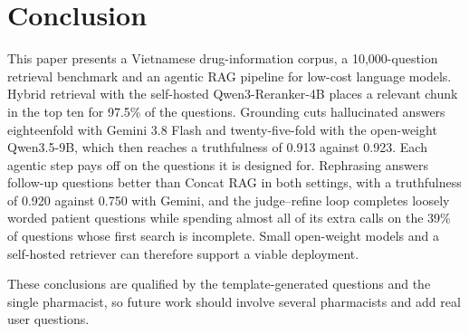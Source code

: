 \section{Conclusion}\label{sec:conclusion}

This paper presents a Vietnamese drug-information corpus, a 10{,}000-question retrieval benchmark and an agentic RAG pipeline for low-cost language models. Hybrid retrieval with the self-hosted Qwen3-Reranker-4B places a relevant chunk in the top ten for 97.5\% of the questions. Grounding cuts hallucinated answers eighteenfold with Gemini 3.8 Flash and twenty-five-fold with the open-weight Qwen3.5-9B, which then reaches a truthfulness of 0.913 against 0.923. Each agentic step pays off on the questions it is designed for. Rephrasing answers follow-up questions better than Concat RAG in both settings, with a truthfulness of 0.920 against 0.750 with Gemini, and the judge--refine loop completes loosely worded patient questions while spending almost all of its extra calls on the 39\% of questions whose first search is incomplete. Small open-weight models and a self-hosted retriever can therefore support a viable deployment.

These conclusions are qualified by the template-generated questions and the single pharmacist, so future work should involve several pharmacists and add real user questions.
